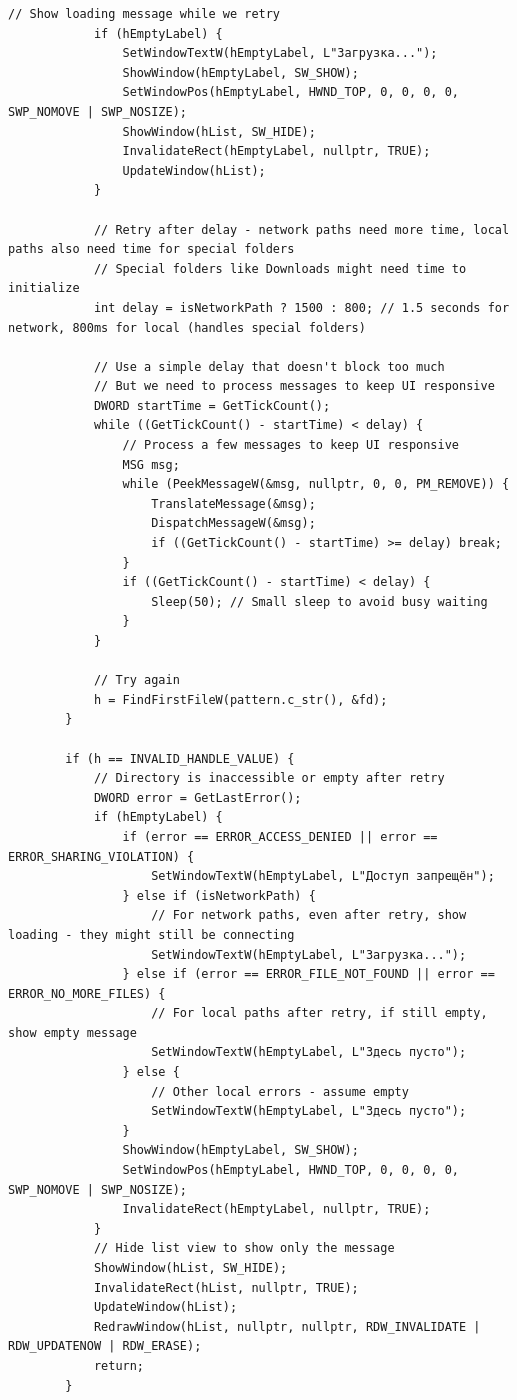 \begin{lstlisting}[style=CodeListing]
            // Show loading message while we retry
            if (hEmptyLabel) {
                SetWindowTextW(hEmptyLabel, L"Загрузка...");
                ShowWindow(hEmptyLabel, SW_SHOW);
                SetWindowPos(hEmptyLabel, HWND_TOP, 0, 0, 0, 0, SWP_NOMOVE | SWP_NOSIZE);
                ShowWindow(hList, SW_HIDE);
                InvalidateRect(hEmptyLabel, nullptr, TRUE);
                UpdateWindow(hList);
            }
            
            // Retry after delay - network paths need more time, local paths also need time for special folders
            // Special folders like Downloads might need time to initialize
            int delay = isNetworkPath ? 1500 : 800; // 1.5 seconds for network, 800ms for local (handles special folders)
            
            // Use a simple delay that doesn't block too much
            // But we need to process messages to keep UI responsive
            DWORD startTime = GetTickCount();
            while ((GetTickCount() - startTime) < delay) {
                // Process a few messages to keep UI responsive
                MSG msg;
                while (PeekMessageW(&msg, nullptr, 0, 0, PM_REMOVE)) {
                    TranslateMessage(&msg);
                    DispatchMessageW(&msg);
                    if ((GetTickCount() - startTime) >= delay) break;
                }
                if ((GetTickCount() - startTime) < delay) {
                    Sleep(50); // Small sleep to avoid busy waiting
                }
            }
            
            // Try again
            h = FindFirstFileW(pattern.c_str(), &fd);
        }
        
        if (h == INVALID_HANDLE_VALUE) {
            // Directory is inaccessible or empty after retry
            DWORD error = GetLastError();
            if (hEmptyLabel) {
                if (error == ERROR_ACCESS_DENIED || error == ERROR_SHARING_VIOLATION) {
                    SetWindowTextW(hEmptyLabel, L"Доступ запрещён");
                } else if (isNetworkPath) {
                    // For network paths, even after retry, show loading - they might still be connecting
                    SetWindowTextW(hEmptyLabel, L"Загрузка...");
                } else if (error == ERROR_FILE_NOT_FOUND || error == ERROR_NO_MORE_FILES) {
                    // For local paths after retry, if still empty, show empty message
                    SetWindowTextW(hEmptyLabel, L"Здесь пусто");
                } else {
                    // Other local errors - assume empty
                    SetWindowTextW(hEmptyLabel, L"Здесь пусто");
                }
                ShowWindow(hEmptyLabel, SW_SHOW);
                SetWindowPos(hEmptyLabel, HWND_TOP, 0, 0, 0, 0, SWP_NOMOVE | SWP_NOSIZE);
                InvalidateRect(hEmptyLabel, nullptr, TRUE);
            }
            // Hide list view to show only the message
            ShowWindow(hList, SW_HIDE);
            InvalidateRect(hList, nullptr, TRUE);
            UpdateWindow(hList);
            RedrawWindow(hList, nullptr, nullptr, RDW_INVALIDATE | RDW_UPDATENOW | RDW_ERASE);
            return;
        }
        

\end{lstlisting}
